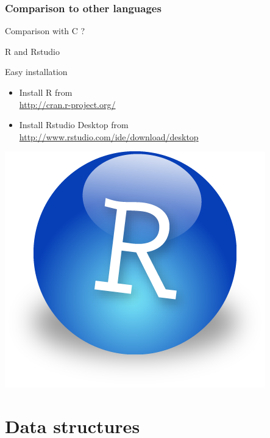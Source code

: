 \documentclass[10pt]{beamer}
\newenvironment{xframe}[2][]
  {\begin{frame}[fragile,environment=xframe,#1]
  \frametitle{#2}}
  {\end{frame}}
\begin{document}

\begin{xframe}{Comparison to other languages}
  Comparison with C ?
\end{xframe}


\begin{frame}{R and Rstudio}
  \begin{block}{Easy installation}
    \begin{itemize}
    \item Install R from  \\ \url{http://cran.r-project.org/}
    \item Install Rstudio Desktop from \\ \url{http://www.rstudio.com/ide/download/desktop}
    \end{itemize}
  \end{block}
  \centering
  \bigskip
  \includegraphics[page=1,height=.3\textheight]{imgs/Rstudio.png}

\end{frame}



\section{Data structures}
\end{document}
